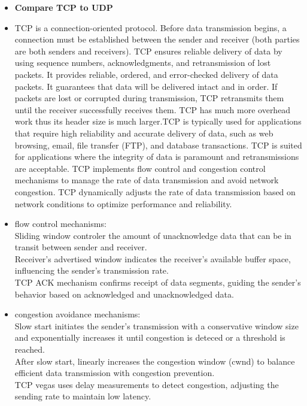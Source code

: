 \documentclass{article}
\begin{document}
\begin{itemize}
  \item \textbf{Compare TCP to UDP}
  	\item[] TCP is a connection-oriented protocol. Before data transmission begins, a connection must be established between the sender and receiver (both parties are both senders and receivers). TCP ensures reliable delivery of data by using sequence numbers, acknowledgments, and retransmission of lost packets. It provides reliable, ordered, and error-checked delivery of data packets. It guarantees that data will be delivered intact and in order. If packets are lost or corrupted during transmission, TCP retransmits them until the receiver successfully receives them. TCP has much more overhead work thus its header size is much larger.TCP is typically used for applications that require high reliability and accurate delivery of data, such as web browsing, email, file transfer (FTP), and database transactions. TCP is suited for applications where the integrity of data is paramount and retransmissions are acceptable. TCP implements flow control and congestion control mechanisms to manage the rate of data transmission and avoid network congestion. TCP dynamically adjusts the rate of data transmission based on network conditions to optimize performance and reliability.\\
  	\item[] flow control mechanisms:\\
		Sliding window controler the amount of unacknowledge data that can be in transit between sender and receiver.\\
		Receiver's advertised window indicates the receiver's available buffer space, influencing the sender's transmission rate.\\
		TCP ACK mechanism confirms receipt of data segments, guiding the sender's behavior based on acknowledged and unacknowledged data.\\
	\item[] congestion avoidance mechanisms:\\
		Slow start initiates the sender's transmission with a conservative window size and exponentially increases it until congestion is deteced or a threshold is reached.\\
		After slow start, linearly increases the congestion window (cwnd) to balance efficient data transmission with congestion prevention.\\
		TCP vegas uses delay measurements to detect congestion, adjusting the sending rate to maintain low latency.\\

\end{itemize}
\end{document}
